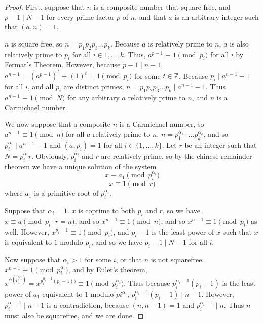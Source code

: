 \documentclass{article}
\begin{document}
\begin{proof}
First, suppose that $n$ is a composite number that square free, and $p-1 \mid N-1$ for every prime factor $p$ of $n$, and that $a$ is an arbitrary integer such that $(a,n) = 1$.
\par $n$ is square free, so $n = p_1 p_2 p_3 \ldots p_k$. Because $a$ is relatively prime to $n$, $a$ is also relatively prime to $p_i$ for all $i \in {1, \ldots, k}$. Thus, $a^{p-1} \equiv 1 \pmod{p_i}$ for all $i$ by Fermat's Theorem. However, because $p -1 \mid n -1$, $a^{n-1} = (a^{p-1})^t \equiv (1)^t = 1 \pmod{p_i}$ for some $t \in \mathbb Z$. Because $p_i \mid a^{n-1} - 1$ for all $i$, and all $p_i$ are distinct primes, $n = p_1p_2p_3 \ldots p_k \mid a^{n-1} - 1$. Thus $a^{n-1} \equiv 1 \pmod N$ for any arbitrary $a$ relatively prime to $n$, and $n$ is a Carmichael number.
\par
We now suppose that a composite $n$ is a Carmichael number, so $a^{n-1} \equiv 1 \pmod n$ for all $a$ relatively prime to $n$. $n = p_1^{\alpha_1}\cdot \ldots p_k^{\alpha_k}$, and so $p_i^{\alpha_i} \mid a^{n-1} - 1 $ and $(a,p_i) = 1$ for all $i \in \{1, \ldots, k\}$. Let $r$ be an integer such that $N = p_i^{\alpha_i} r$. Obviously, $p_i^{\alpha_i}$ and $r$ are relatively prime, so by the chinese remainder theorem we have a unique solution of the system
	$$x \equiv a_1 \pmod{p_i^{\alpha_i}}$$
	$$x \equiv 1 \pmod{r}$$
where $a_1$ is a primitive root of $p_i^{\alpha_i}$. 
\par Suppose that $\alpha_i = 1$. $x$ is coprime to both $p_i$ and $r$, so we have $x \equiv a \pmod{p_i \cdot r = n}$, and so $x^{n-1} \equiv 1 \pmod n$, and so $x^{n-1} \equiv 1 \pmod p_i$ as well. However, $x^{p_i - 1} \equiv 1 \pmod{p_i}$, and $p_i - 1$ is the least power of $x$ such that $x$ is equivalent to $1$ modulo $p_i$, and so we have $p_i -1 \mid N - 1$ for all $i$. 
\par Now suppose that $\alpha_i >1$ for some $i$, or that $n$ is not squarefree. $x^{n-1} \equiv 1 \pmod{p_i^{\alpha_i}}$, and by Euler's theorem, $x^{\phi(p_i^{\alpha_i})} = x^{p_i^{\alpha_i - 1}(p_i - 1))}  \equiv 1 \pmod{p_i^{\alpha_i}}$. Thus because $p_i^{\alpha_i -1}(p_i - 1)$ is the least power of $a_1$ equivalent to $1$ modulo $pi^{\alpha_i}$, $p_i^{\alpha_i -1}(p_i - 1) \mid n - 1$. However, $p_i^{\alpha_i - 1} \mid n - 1$ is a contradiction, because $(n, n-1) = 1$ and $p_i^{\alpha_i - 1} \mid n$. Thus $n$ must also be squarefree, and we are done. 
\end{proof}
\end{document}

